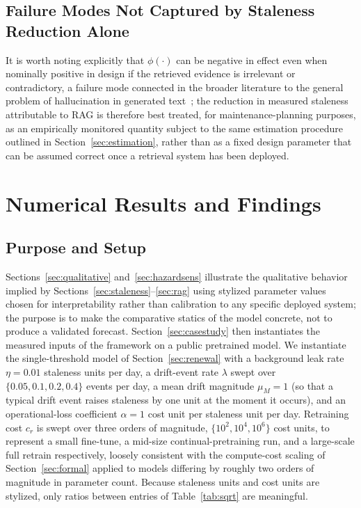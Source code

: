 \documentclass[electronics,article,submit,pdftex,moreauthors]{Definitions/mdpi}
\begin{document}
\subsection{Failure Modes Not Captured by Staleness Reduction Alone}

It is worth noting explicitly that $\phi(\cdot)$ can be negative in effect even when nominally positive in design if the retrieved evidence is irrelevant or contradictory, a failure mode connected in the broader literature to the general problem of hallucination in generated text~\cite{Ji2023}; the reduction in measured staleness attributable to RAG is therefore best treated, for maintenance-planning purposes, as an empirically monitored quantity subject to the same estimation procedure outlined in Section~\ref{sec:estimation}, rather than as a fixed design parameter that can be assumed correct once a retrieval system has been deployed.

\section{Numerical Results and Findings}\label{sec:numerical}

\subsection{Purpose and Setup}

Sections~\ref{sec:qualitative} and~\ref{sec:hazardsens} illustrate the qualitative behavior implied by Sections~\ref{sec:staleness}--\ref{sec:rag} using stylized parameter values chosen for interpretability rather than calibration to any specific deployed system; the purpose is to make the comparative statics of the model concrete, not to produce a validated forecast. Section~\ref{sec:casestudy} then instantiates the measured inputs of the framework on a public pretrained model. We instantiate the single-threshold model of Section~\ref{sec:renewal} with a background leak rate $\eta=0.01$ staleness units per day, a drift-event rate $\lambda$ swept over $\{0.05,0.1,0.2,0.4\}$ events per day, a mean drift magnitude $\mu_M=1$ (so that a typical drift event raises staleness by one unit at the moment it occurs), and an operational-loss coefficient $\alpha=1$ cost unit per staleness unit per day. Retraining cost $c_r$ is swept over three orders of magnitude, $\{10^2,10^4,10^6\}$ cost units, to represent a small fine-tune, a mid-size continual-pretraining run, and a large-scale full retrain respectively, loosely consistent with the compute-cost scaling of Section~\ref{sec:formal} applied to models differing by roughly two orders of magnitude in parameter count. Because staleness units and cost units are stylized, only ratios between entries of Table~\ref{tab:sqrt} are meaningful.
\end{document}
